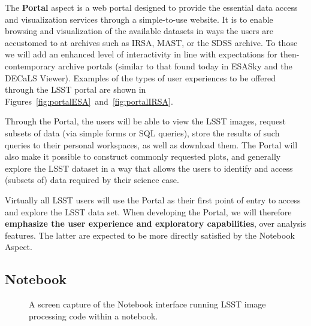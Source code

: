 The \textbf{Portal} aspect is a web portal designed to provide the essential data
access and visualization services through a simple-to-use website.  It is to
enable browsing and visualization of the available datasets in ways the
users are accustomed to at archives such as IRSA, MAST, or the SDSS archive.
To those we will add an enhanced level of interactivity in line with expectations for
then-contemporary archive portals (similar to that found today in ESASky and
the DECaLS Viewer). Examples of the types of user experiences to be offered
through the LSST portal are shown in Figures~\ref{fig:portalESA}~and~\ref{fig:portalIRSA}.

Through the Portal, the users will be
able to view the LSST images, request subsets of data (via simple forms or
SQL queries), store the results of such queries to their personal
workspaces, as well as download them. The Portal will also make it possible to
construct commonly requested plots, and generally explore the
LSST dataset in a way that allows the users to identify and access (subsets of)
data required by their science case.

Virtually all LSST users will use the Portal as their first point of entry to
access and explore the LSST data set. When developing the Portal,
we will therefore \textbf{emphasize the user experience and exploratory
capabilities}, over analysis features. The latter are expected to be more
directly satisfied by the Notebook Aspect.

\subsection{Notebook\label{sec:jupyter}}

\begin{figure}
	\centering
	\caption{A screen capture of the Notebook interface running LSST image processing code within a notebook. \label{fig:JupyterLab}}
\end{figure}


